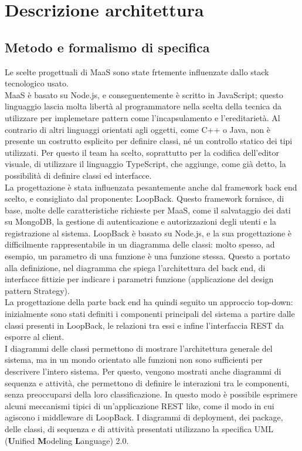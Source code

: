 \section{Descrizione architettura}
\subsection{Metodo e formalismo di specifica}
Le scelte progettuali di MaaS sono state frtemente influenzate dallo stack tecnologico usato. \\
MaaS è basato su Node.js, e conseguentemente è scritto in JavaScript; questo linguaggio lascia molta libertà al programmatore nella scelta della tecnica da utilizzare per implemetare pattern come l'incapsulamento e l'ereditarietà. Al contrario di altri linguaggi orientati agli oggetti, come C++ o Java, non è presente un costrutto esplicito per definire classi, né un controllo statico dei tipi utilizzati. Per questo il team ha scelto, soprattutto per la codifica dell'editor visuale, di utilizzare il linguaggio TypeScript, che aggiunge, come già detto, la possibilità di definire classi ed interfacce. \\
La progettazione è stata influenzata pesantemente anche dal framework back end scelto, e consigliato dal proponente: LoopBack. Questo framework fornisce, di base, molte delle caratteristiche richieste per MaaS, come il salvataggio dei dati su MongoDB, la gestione di autenticazione e autorizzazioni degli utenti e la registrazione al sistema. LoopBack è basato su Node.js, e la sua progettazione è difficilmente rappresentabile in un diagramma delle classi: molto spesso, ad esempio, un parametro di una funzione è una funzione stessa. Questo a portato alla definizione, nel diagramma che spiega l'architettura del back end, di interfacce fittizie per indicare i parametri funzione (applicazione del design pattern Strategy). \\
La progettazione della parte back end ha quindi seguito un approccio top-down: inizialmente sono stati definiti i componenti principali del sistema a partire dalle classi presenti in LoopBack, le relazioni tra essi e infine l'interfaccia REST da esporre al client. \\
I diagrammi delle classi permettono di mostrare l'architettura generale del sistema, ma in un mondo orientato alle funzioni non sono sufficienti per descrivere l'intero sistema. Per questo, vengono mostrati anche diagrammi di sequenza e attività, che permettono di definire le interazioni tra le componenti, senza preoccuparsi della loro classificazione. In questo modo è possibile esprimere alcuni meccanismi tipici di un'applicazione REST like, come il modo in cui agiscono i middleware di LoopBack. 
I diagrammi di deployment, dei package, delle classi, di sequenza e di attività presentati utilizzano la specifica UML (\textbf{U}nified \textbf{M}odeling \textbf{L}anguage) 2.0.